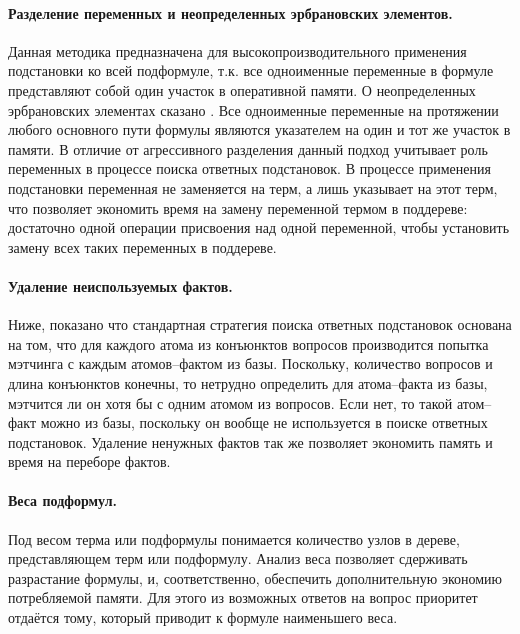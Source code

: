 \paragraph{Разделение переменных и неопределенных эрбрановских элементов.} Данная методика предназначена для высокопроизводительного применения подстановки ко всей подформуле, т.к. все одноименные переменные в формуле представляют собой один участок в оперативной памяти. О неопределенных эрбрановских элементах сказано . Все одноименные переменные на протяжении любого основного пути формулы \cite{dissChe} являются указателем на один и тот же участок в памяти. В отличие от агрессивного разделения данный подход учитывает роль переменных в процессе поиска ответных подстановок. В процессе применения подстановки переменная не заменяется на терм, а лишь указывает на этот терм, что позволяет экономить время на замену переменной термом в поддереве: достаточно одной операции присвоения над одной переменной, чтобы установить замену всех таких переменных в поддереве.


\paragraph{Удаление неиспользуемых фактов.} Ниже, показано что стандартная стратегия поиска ответных подстановок основана на том, что для каждого атома из конъюнктов вопросов производится попытка мэтчинга с каждым атомов--фактом из базы. Поскольку, количество вопросов и длина конъюнктов конечны, то нетрудно определить для атома--факта из базы, мэтчится ли он хотя бы с одним атомом из вопросов. Если нет, то такой атом--факт можно  из базы, поскольку он вообще не используется в поиске ответных подстановок. Удаление ненужных фактов так же позволяет экономить память и время на переборе фактов.

\paragraph{Веса подформул.} Под весом терма или подформулы понимается количество узлов в дереве, представляющем терм или подформулу. Анализ веса позволяет сдерживать разрастание формулы, и, соответственно, обеспечить дополнительную экономию потребляемой памяти. Для этого из возможных ответов на вопрос приоритет отдаётся тому, который приводит к формуле наименьшего веса.


